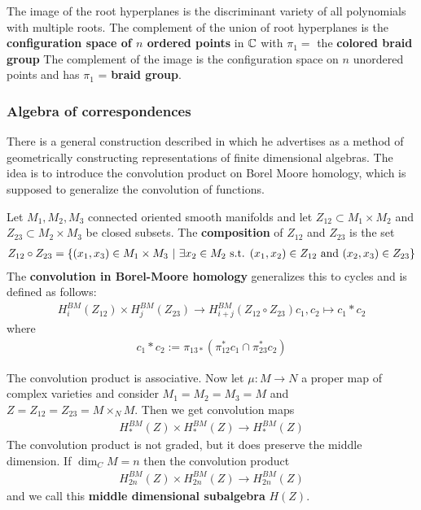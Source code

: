 \begin{remark}
    The image of the root hyperplanes is the discriminant variety of all polynomials
    with multiple roots. The complement of the union of root hyperplanes is 
    the \textbf{configuration space of $n$ ordered points} in $\mathbb{C}$ with $\pi_1 = $ the \textbf{
        colored braid group
    } The complement of the image is the configuration space on $n$ unordered points and
    has $\pi_1$ = \textbf{braid group}.
\end{remark}

\subsubsection{Algebra of correspondences}
There is a general construction described in \cite{ginzburg} 
which he advertises as a method of geometrically constructing 
representations of finite dimensional algebras. The idea is to
introduce the convolution product on Borel Moore homology, which is 
supposed to generalize the convolution of functions. 

\begin{definition}
    Let $M_1,M_2,M_3$ connected oriented smooth manifolds and let $Z_{12}\subset M_1\times M_2$
    and $Z_{23}\subset M_2\times M_3$ be closed subsets. The \textbf{composition} of
    $Z_{12}$ and $Z_{23}$ is the set \begin{align*}
        Z_{12}\circ Z_{23} = \{(x_1,x_3)\in M_1\times M_3 \ \vert \  \exists x_2\in M_2 \text{ s.t. } (x_1,x_2)\in Z_{12} \text{ and } (x_2,x_3)\in Z_{23}\}
    \end{align*}
    The \textbf{convolution in Borel-Moore homology} generalizes 
    this to cycles and is defined as follows:
    \begin{align*}
        H^{BM}_i(Z_{12}) \times H^{BM}_j(Z_{23}) \to H^{BM}_{i+j}(Z_{12}\circ Z_{23})
        c_1,c_2 \mapsto c_1 * c_2
    \end{align*} where 
    \begin{align*}
        c_1 * c_2 := \pi_{13*}(\pi_{12}^*c_1 \cap \pi_{23}^*c_2)
    \end{align*}
\end{definition}

The convolution product is associative. Now let $\mu:M\to N$ a proper map 
of complex varieties and consider $M_1 = M_2 = M_3 = M$ and $Z = Z_{12} = Z_{23} 
= M\times_N M$. Then we get convolution maps \begin{align*}
    H^{BM}_*(Z) \times H^{BM}_*(Z) \to H^{BM}_{*}(Z)
\end{align*} The convolution product is not graded, but it does preserve the 
middle dimension. If $\dim_C M = n$ then the convolution product
\begin{align*}
    H^{BM}_{2n}(Z) \times H^{BM}_{2n}(Z) \to H^{BM}_{2n}(Z)
\end{align*} and we call this \textbf{middle dimensional subalgebra} $H(Z)$.

